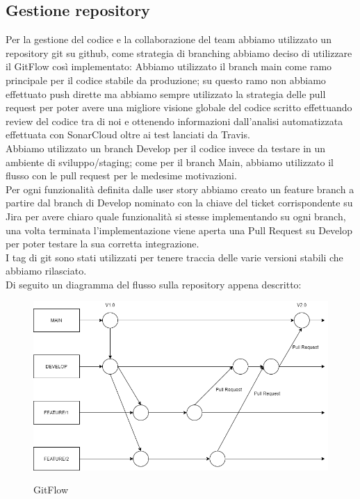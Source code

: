 \documentclass{article}
\begin{document}
\subsection{Gestione repository}
Per la gestione del codice e la collaborazione del team abbiamo utilizzato un repository git su github, come strategia di branching abbiamo deciso di utilizzare il GitFlow così implementato:
Abbiamo utilizzato il branch main come ramo principale per il codice stabile da produzione; su questo ramo non abbiamo effettuato push dirette
ma abbiamo sempre utilizzato la strategia delle pull request per poter avere una migliore visione globale del codice scritto effettuando review del
codice tra di noi e ottenendo informazioni dall’analisi automatizzata effettuata con SonarCloud oltre ai test lanciati da Travis.\\
Abbiamo utilizzato un branch Develop per il codice invece da testare in un ambiente di sviluppo/staging; come per il branch Main, abbiamo
utilizzato il flusso con le pull request per le medesime motivazioni.\\
Per ogni funzionalità definita dalle user story abbiamo creato un feature branch a partire dal branch di Develop nominato con la chiave del ticket corrispondente su Jira per avere chiaro quale funzionalità si stesse implementando su ogni branch, una volta terminata l’implementazione viene aperta una Pull Request su Develop per poter testare la sua corretta integrazione.\\
I tag di git sono stati utilizzati per tenere traccia delle varie versioni stabili che abbiamo rilasciato.\\
Di seguito un diagramma del flusso sulla repository appena descritto:\\
\begin{figure}[h!]
\centering
\includegraphics[scale=0.5]{GitFlow.png}
\label{fig:GitFlow}
\caption{GitFlow}
\end{figure}
\end{document}
